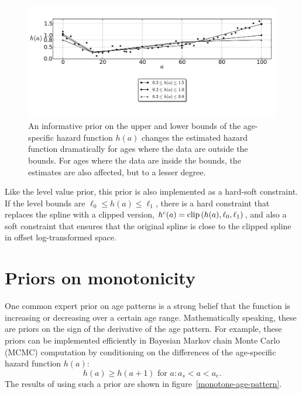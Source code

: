 \begin{figure}[h]
\begin{center}
\includegraphics[width=\textwidth]{level_bound-smoothing-splines.pdf}
\caption[An informative prior on the upper and lower bounds of the
  age-specific hazard function $h(a)$.]{An informative prior on the
  upper and lower bounds of the age-specific hazard function $h(a)$
  changes the estimated hazard function dramatically for
  ages where the data are outside the bounds. For ages where the data
  are inside the bounds, the estimates are also affected, but to a lesser degree.}
\label{level-bounds-priors}
\end{center}
\end{figure}



Like the level value prior, this prior is also implemented as a
hard-soft constraint.  If the level bounds are $\ell_0 \leq h(a)
\leq \ell_1$, there is a hard constraint that replaces the spline with a
clipped version, $h^c(a) = \operatorname{clip}\left(h(a), \ell_0, \ell_1\right)$, and
also a soft constraint that ensures that the original spline is close to the clipped
spline in offset log-transformed space.

\section{Priors on monotonicity}

One common expert prior on age patterns is a strong belief that the
function is increasing or decreasing over a certain age
range. Mathematically speaking, these are priors on the sign of the
derivative of the age pattern.  For example, these priors can be implemented efficiently in
Bayesian Markov chain Monte Carlo (MCMC) computation by conditioning on the differences of the
age-specific hazard function $h(a)$:
\[
h(a) \geq h(a+1) \text{ for } a : a_s < a < a_e.
\]
The results of using such a prior are shown in
figure~\ref{monotone-age-pattern}.


